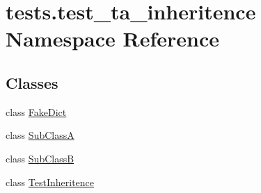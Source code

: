 \hypertarget{namespacetests_1_1test__ta__inheritence}{}\section{tests.\+test\+\_\+ta\+\_\+inheritence Namespace Reference}
\label{namespacetests_1_1test__ta__inheritence}
\subsection*{Classes}
\begin{DoxyCompactItemize}
\item 
class \hyperlink{classtests_1_1test__ta__inheritence_1_1FakeDict}{Fake\+Dict}
\item 
class \hyperlink{classtests_1_1test__ta__inheritence_1_1SubClassA}{Sub\+ClassA}
\item 
class \hyperlink{classtests_1_1test__ta__inheritence_1_1SubClassB}{Sub\+ClassB}
\item 
class \hyperlink{classtests_1_1test__ta__inheritence_1_1TestInheritence}{Test\+Inheritence}
\end{DoxyCompactItemize}

